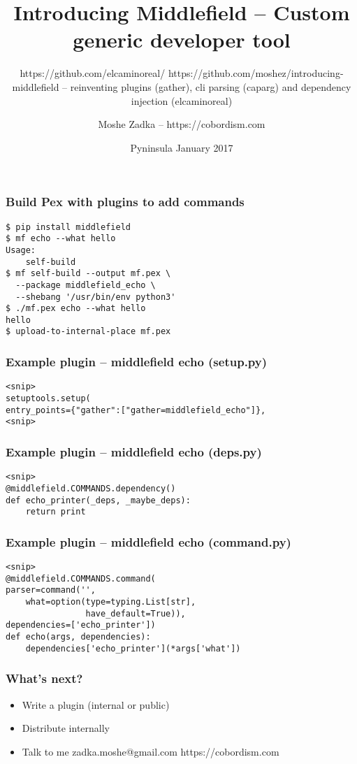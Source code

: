 \usepackage[utf8]{inputenc}
\usepackage{listings}

\title{Introducing Middlefield -- Custom generic developer tool}
\subtitle{https://github.com/elcaminoreal/ https://github.com/moshez/introducing-middlefield -- reinventing plugins (gather), cli parsing (caparg) and dependency injection (elcaminoreal)}
\author{Moshe Zadka -- https://cobordism.com}
\date{Pyninsula January 2017}
 

 
\frame{\titlepage}

\begin{frame}[fragile]
\frametitle{Build Pex with plugins to add commands}
\begin{lstlisting}
$ pip install middlefield
$ mf echo --what hello
Usage:
    self-build
$ mf self-build --output mf.pex \
  --package middlefield_echo \
  --shebang '/usr/bin/env python3'
$ ./mf.pex echo --what hello 
hello
$ upload-to-internal-place mf.pex
\end{lstlisting}
\end{frame}

\begin{frame}[fragile]
\frametitle{Example plugin -- middlefield echo (setup.py)}
\begin{lstlisting}
<snip>
setuptools.setup(
entry_points={"gather":["gather=middlefield_echo"]},
<snip>
\end{lstlisting}
\end{frame}

\begin{frame}[fragile]
\frametitle{Example plugin -- middlefield echo (deps.py)}
\begin{lstlisting}
<snip>
@middlefield.COMMANDS.dependency()
def echo_printer(_deps, _maybe_deps):
    return print
\end{lstlisting}
\end{frame}

\begin{frame}[fragile]
\frametitle{Example plugin -- middlefield echo (command.py)}
\begin{lstlisting}
<snip>
@middlefield.COMMANDS.command(
parser=command('',
    what=option(type=typing.List[str],
                have_default=True)),
dependencies=['echo_printer'])
def echo(args, dependencies):
    dependencies['echo_printer'](*args['what'])
\end{lstlisting}
\end{frame}

\begin{frame}
\frametitle{What's next?}
\begin{itemize}
\item Write a plugin (internal or public)
\item Distribute internally
\item Talk to me zadka.moshe@gmail.com https://cobordism.com
\end{itemize}
\end{frame}


